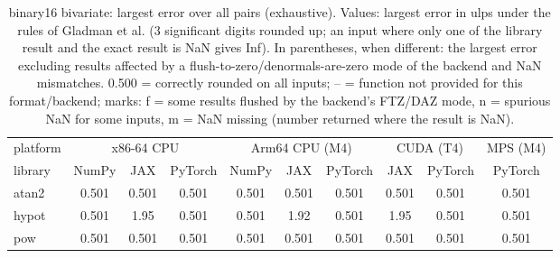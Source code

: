 \begin{table}
\centering
\begin{small}
\begin{tabular}{|l|ccc|ccc|cc|c|}
\hline
platform & \multicolumn{3}{c|}{x86-64 CPU} & \multicolumn{3}{c|}{Arm64 CPU (M4)} & \multicolumn{2}{c|}{CUDA (T4)} & \multicolumn{1}{c|}{MPS (M4)} \\
library & NumPy & JAX & PyTorch & NumPy & JAX & PyTorch & JAX & PyTorch & PyTorch \\ \hline
atan2 & 0.501 & 0.501 & 0.501 & 0.501 & 0.501 & 0.501 & 0.501 & 0.501 & 0.501 \\
hypot & 0.501 & 1.95 & 0.501 & 0.501 & 1.92 & 0.501 & 1.95 & 0.501 & 0.501 \\
pow & 0.501 & 0.501 & 0.501 & 0.501 & 0.501 & 0.501 & 0.501 & 0.501 & 0.501 \\
\hline
\end{tabular}
\end{small}
\caption{binary16 bivariate: largest error over all pairs (exhaustive). Values: largest error in ulps under the rules of Gladman et al. (3 significant digits rounded up; an input where only one of the library result and the exact result is NaN gives Inf). In parentheses, when different: the largest error excluding results affected by a flush-to-zero/denormals-are-zero mode of the backend and NaN mismatches. 0.500 = correctly rounded on all inputs; -- = function not provided for this format/backend; marks: f = some results flushed by the backend's FTZ/DAZ mode, n = spurious NaN for some inputs, m = NaN missing (number returned where the result is NaN). }
\label{tab:binary16bi}
\end{table}
